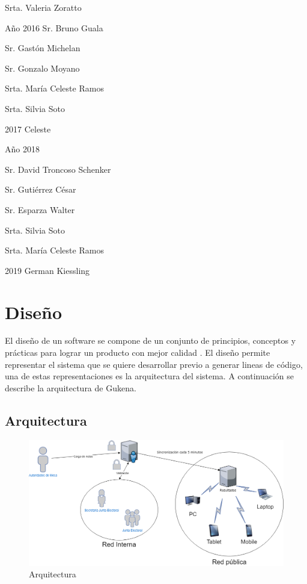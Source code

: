 Srta. Valeria Zoratto

 
Año 2016	
Sr. Bruno Guala

Sr. Gastón Michelan

Sr. Gonzalo Moyano

Srta. María Celeste Ramos

Srta. Silvia Soto

2017
Celeste

Año 2018

Sr. David Troncoso Schenker

Sr. Gutiérrez César

Sr. Esparza Walter

Srta. Silvia Soto

Srta. María Celeste Ramos

2019
German Kiessling 




\section{Diseño}
El diseño de un software se compone de un conjunto de principios, conceptos y prácticas para lograr un producto con mejor calidad \cite{pressman1988ingenieria}. El diseño permite representar el sistema que se quiere desarrollar previo a generar lineas de código, una de estas representaciones es la arquitectura del sistema. A continuación se describe la arquitectura de Gukena. 

\subsection{Arquitectura}

\begin{figure}[h!]
  \includegraphics[width=\textwidth]{img/arquitectura.png}
  \caption{Arquitectura}
  \label{graf:arquitectura}
\end{figure}

